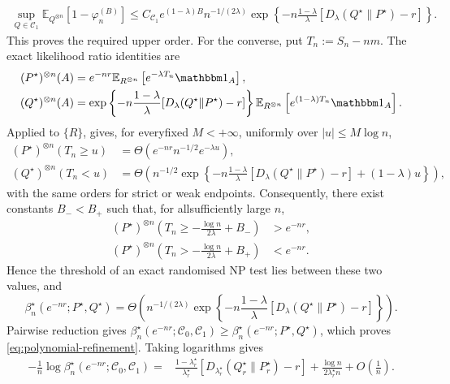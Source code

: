 \documentclass[journal,10pt,draftclsnofoot,onecolumn]{IEEEtran}
\begin{document}
\begin{IEEEproof}
\begin{equation*}
\begin{aligned}
\sup_{Q\in\mathcal C_1} \mathbb E_{Q^{\otimes n}}[1-\varphi_n^{(B)}] \leq{} C_{\mathcal C_1}e^{(1-\lambda)B} n^{-1/(2\lambda)} \exp\left\{ -n\frac{1-\lambda}{\lambda} [D_\lambda(Q^\star\|P^\star)-r] \right\}.
\end{aligned}
\end{equation*}
This proves the required upper order. For the converse, put $T_n:=S_n-nm$. The exact likelihood ratio identities are
\begin{equation*}
\begin{aligned} 
(P^\star)^{\otimes n}(A) &= e^{-nr} \mathbb E_{R^{\otimes n}} \left[e^{-\lambda T_n}\mathbbm 1_A\right], \\ (Q^\star)^{\otimes n}(A) &= \exp\left\{ -n\frac{1-\lambda}{\lambda} [D_\lambda(Q^\star\|P^\star)-r] \right\} \mathbb E_{R^{\otimes n}} \left[e^{(1-\lambda)T_n}\mathbbm 1_A\right].
\end{aligned}
\end{equation*}
Applied to $\{R\}$,  gives, for everyfixed $M<+\infty$, uniformly over $|u|\leq M\log n$,
\begin{equation*}
\begin{aligned} 
(P^\star)^{\otimes n}(T_n\geq u) &= \Theta\left( e^{-nr}n^{-1/2}e^{-\lambda u} \right), \\ (Q^\star)^{\otimes n}(T_n<u) &= \Theta\left( n^{-1/2} \exp\left\{ -n\frac{1-\lambda}{\lambda} [D_\lambda(Q^\star\|P^\star)-r] +(1-\lambda)u \right\} \right),
\end{aligned}
\end{equation*}
with the same orders for strict or weak endpoints. Consequently, there exist constants $B_-<B_+$ such that, for allsufficiently large $n$,
\begin{equation*}
\begin{aligned} 
(P^\star)^{\otimes n} \left( T_n\geq-\frac{\log n}{2\lambda}+B_- \right) &>e^{-nr}, \\ (P^\star)^{\otimes n} \left( T_n>-\frac{\log n}{2\lambda}+B_+ \right) &<e^{-nr}.
\end{aligned}
\end{equation*}
Hence the threshold of an exact randomised NP test lies between these two values, and
\begin{equation*} 
\beta_n^\star(e^{-nr};P^\star,Q^\star) = \Theta\left( n^{-1/(2\lambda)} \exp\left\{ -n\frac{1-\lambda}{\lambda} [D_\lambda(Q^\star\|P^\star)-r] \right\} \right).
\end{equation*} 
Pairwise reduction gives $\beta_n^\star(e^{-nr};\mathcal C_0,\mathcal C_1) \geq\beta_n^\star(e^{-nr};P^\star,Q^\star)$, which proves \eqref{eq:polynomial-refinement}. Taking logarithms gives
\begin{equation*}
\begin{aligned} -\frac{1}{n} \log\beta_n^\star(e^{-nr};\mathcal C_0,\mathcal C_1) ={}& \frac{1-\lambda_r^\star}{\lambda_r^\star} \left[ D_{\lambda_r^\star}(Q_r^\star\|P_r^\star)-r \right] + \frac{\log n}{2\lambda_r^\star n} + O\left(\frac{1}{n}\right).
\end{aligned}
\end{equation*}
\end{IEEEproof}
\end{document}
